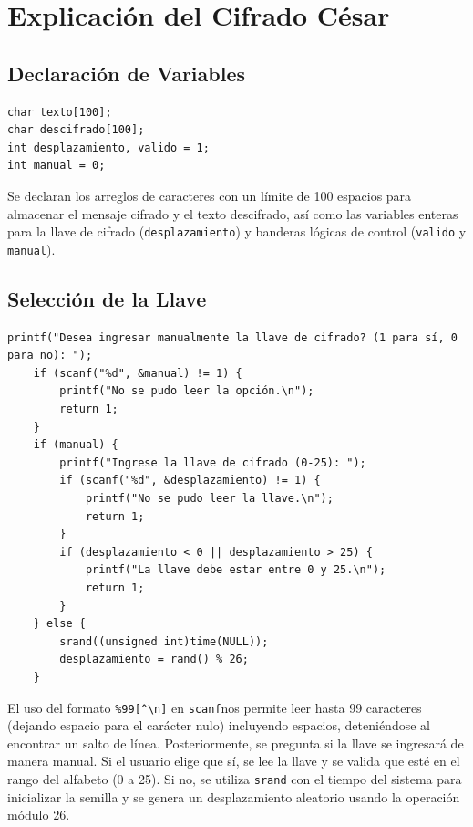\documentclass[12pt, letterpaper]{article}
\begin{document}


\section{Explicación del Cifrado César}

\subsection{Declaración de Variables}

\begin{lstlisting}[style=cstyle, caption={Declaración de variables y arreglos de caracteres.}, label={lst:listing_1}]
char texto[100];
char descifrado[100];
int desplazamiento, valido = 1;
int manual = 0;
\end{lstlisting}

Se declaran los arreglos de caracteres con un límite de 100 espacios para almacenar el mensaje cifrado y el texto descifrado, así como las variables enteras para la llave de cifrado (\texttt{desplazamiento}) y banderas lógicas de control (\texttt{valido} y \texttt{manual}).

\subsection{Selección de la Llave}

\begin{lstlisting}[style=cstyle, caption={Selección de la llave de cifrado.}, label={lst:listing_2}]
    printf("Desea ingresar manualmente la llave de cifrado? (1 para sí, 0 para no): ");
    if (scanf("%d", &manual) != 1) {
        printf("No se pudo leer la opción.\n");
        return 1;
    }
    if (manual) {
        printf("Ingrese la llave de cifrado (0-25): ");
        if (scanf("%d", &desplazamiento) != 1) {
            printf("No se pudo leer la llave.\n");
            return 1;
        }
        if (desplazamiento < 0 || desplazamiento > 25) {
            printf("La llave debe estar entre 0 y 25.\n");
            return 1;
        }
    } else {
        srand((unsigned int)time(NULL));
        desplazamiento = rand() % 26;
    }
\end{lstlisting}

El uso del formato \texttt{\%99[\textasciicircum\textbackslash n]} en \texttt{scanf}nos permite leer hasta 99 caracteres (dejando espacio para el carácter nulo) incluyendo espacios, deteniéndose al encontrar un salto de línea. Posteriormente, se pregunta si la llave se ingresará de manera manual. Si el usuario elige que sí, se lee la llave y se valida que esté en el rango del alfabeto (0 a 25). Si no, se utiliza \texttt{srand} con el tiempo del sistema para inicializar la semilla y se genera un desplazamiento aleatorio usando la operación módulo 26.
\end{document}
